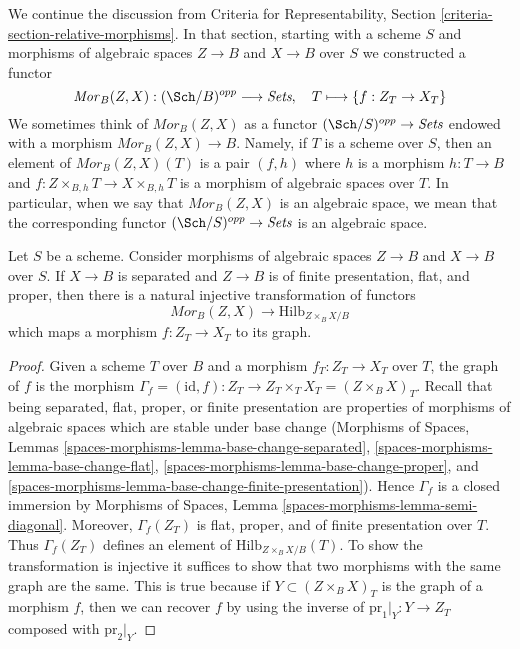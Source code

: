 \noindent
We continue the discussion from Criteria for Representability, Section
\ref{criteria-section-relative-morphisms}.
In that section, starting with a scheme $S$ and morphisms
of algebraic spaces $Z \to B$ and $X \to B$ over $S$
we constructed a functor
$$
\mathit{Mor}_B(Z, X) : (\Sch/B)^{opp} \longrightarrow \textit{Sets}, \quad
T \longmapsto \{f : Z_T \to X_T\}
$$
We sometimes think of $\mathit{Mor}_B(Z, X)$
as a functor $(\Sch/S)^{opp} \to \textit{Sets}$ endowed with a morphism
$\mathit{Mor}_B(Z, X) \to B$.
Namely, if $T$ is a scheme over $S$, then an element
of $\mathit{Mor}_B(Z, X)(T)$ is a pair $(f, h)$
where $h$ is a morphism $h : T \to B$
and $f : Z \times_{B, h} T \to X \times_{B, h} T$
is a morphism of algebraic spaces over $T$. In particular, when we say
that $\mathit{Mor}_B(Z, X)$ is an algebraic space, we mean that the
corresponding functor $(\Sch/S)^{opp} \to \textit{Sets}$ is an algebraic space.

\begin{lemma}
\label{lemma-Mor-into-Hilb}
Let $S$ be a scheme. Consider morphisms
of algebraic spaces $Z \to B$ and $X \to B$ over $S$.
If $X \to B$ is separated and $Z \to B$ is
of finite presentation, flat, and proper,
then there is a natural
injective transformation of functors
$$
\mathit{Mor}_B(Z, X) \longrightarrow \text{Hilb}_{Z \times_B X/B}
$$
which maps a morphism $f : Z_T \to X_T$ to its graph.
\end{lemma}

\begin{proof}
Given a scheme $T$ over $B$ and a morphism $f_T : Z_T \to X_T$
over $T$, the graph of $f$ is the morphism
$\Gamma_f = (\text{id}, f) : Z_T \to Z_T \times_T X_T = (Z \times_B X)_T$.
Recall that being separated, flat, proper, or finite presentation
are properties of morphisms of algebraic spaces which are stable
under base change (Morphisms of Spaces, Lemmas
\ref{spaces-morphisms-lemma-base-change-separated},
\ref{spaces-morphisms-lemma-base-change-flat},
\ref{spaces-morphisms-lemma-base-change-proper}, and
\ref{spaces-morphisms-lemma-base-change-finite-presentation}).
Hence $\Gamma_f$ is a closed immersion by
Morphisms of Spaces, Lemma \ref{spaces-morphisms-lemma-semi-diagonal}.
Moreover, $\Gamma_f(Z_T)$ is flat, proper, and of finite presentation over $T$.
Thus $\Gamma_f(Z_T)$ defines an element of $\text{Hilb}_{Z \times_B X/B}(T)$.
To show the transformation is injective it suffices to show that
two morphisms with the same graph are the same. This is true because
if $Y \subset (Z \times_B X)_T$ is the graph of a morphism $f$, then
we can recover $f$ by using the inverse of $\text{pr}_1|_Y : Y \to Z_T$
composed with $\text{pr}_2|_Y$.
\end{proof}

